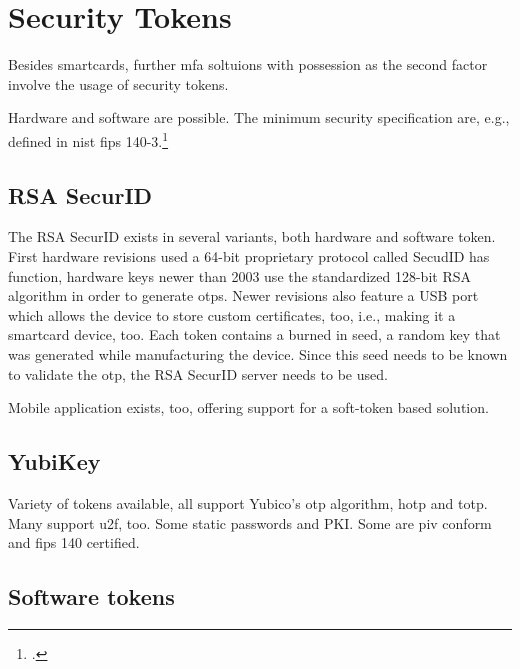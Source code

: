 \section{Security Tokens}

Besides smartcards, further \gls{mfa} soltuions with possession as the second factor involve the usage of security tokens.

Hardware and software are possible. The minimum security specification are, e.g., defined in \gls{nist} \gls{fips} 140-3.\footcites[See][]{FIPS140-3}

\subsection{RSA SecurID}

The RSA SecurID exists in several variants, both hardware and software token. First hardware revisions used a 64-bit proprietary protocol called \flqq SecudID has function\flqq, hardware keys newer than 2003 use the standardized 128-bit RSA algorithm in order to generate \glspl{otp}. Newer revisions also feature a USB port which allows the device to store custom certificates, too, i.e., making it a smartcard device, too. Each token contains a burned in seed, a random key that was generated while manufacturing the device. Since this seed needs to be known to validate the \gls{otp}, the RSA SecurID server needs to be used.

Mobile application exists, too, offering support for a soft-token based solution.

\subsection{YubiKey}

Variety of tokens available, all support Yubico's \gls{otp} algorithm, \gls{hotp} and \gls{totp}. Many support \gls{u2f}, too. Some static passwords and PKI. Some are \gls{piv} conform and \gls{fips} 140 certified.

\subsection{Software tokens}